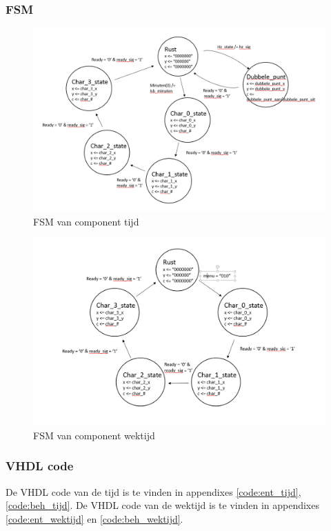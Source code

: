 \subsubsection{FSM}
\begin{figure}[h!]
	\center
	\includegraphics[scale=1.9]{Figuren/LCD/fsm_tijd.png}
	\caption{FSM van component tijd}
	\label{fig:fsm_tijd}
\end{figure}
\begin{figure}[h!]
	\center
	\includegraphics[scale=1.9]{Figuren/LCD/fsm_wektijd.png}
	\caption{FSM van component wektijd}
	\label{fig:fsm_wektijd}
\end{figure}

\subsubsection{VHDL code}
De VHDL code van de tijd is te vinden in appendixes \ref{code:ent_tijd}, \ref{code:beh_tijd}. De VHDL code van de wektijd is te vinden in appendixes \ref{code:ent_wektijd} en \ref{code:beh_wektijd}.

